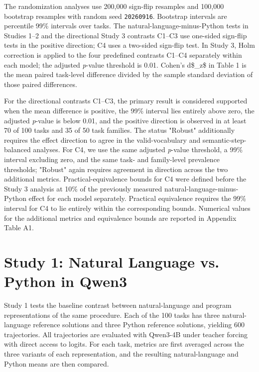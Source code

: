 \documentclass[sn-mathphys-num]{sn-jnl}
\begin{document}
The randomization analyses use 200,000 sign-flip resamples and 100,000 bootstrap resamples with random seed \texttt{20260916}. Bootstrap intervals are percentile 99\% intervals over tasks. The natural-language-minus-Python tests in Studies 1--2 and the directional Study 3 contrasts C1--C3 use one-sided sign-flip tests in the positive direction; C4 uses a two-sided sign-flip test. In Study 3, Holm correction is applied to the four predefined contrasts C1--C4 separately within each model; the adjusted \emph{p}-value threshold is 0.01. Cohen's d\$\_{z}\$ in Table 1 is the mean paired task-level difference divided by the sample standard deviation of those paired differences.

For the directional contrasts C1--C3, the primary result is considered supported when the mean difference is positive, the 99\% interval lies entirely above zero, the adjusted \emph{p}-value is below 0.01, and the positive direction is observed in at least 70 of 100 tasks and 35 of 50 task families. The status "Robust" additionally requires the effect direction to agree in the valid-vocabulary and semantic-step-balanced analyses. For C4, we use the same adjusted \emph{p}-value threshold, a 99\% interval excluding zero, and the same task- and family-level prevalence thresholds; "Robust" again requires agreement in direction across the two additional metrics. Practical-equivalence bounds for C4 were defined before the Study 3 analysis at 10\% of the previously measured natural-language-minus-Python effect for each model separately. Practical equivalence requires the 99\% interval for C4 to lie entirely within the corresponding bounds. Numerical values for the additional metrics and equivalence bounds are reported in Appendix Table A1.

\section{Study 1: Natural Language vs. Python in Qwen3}

Study 1 tests the baseline contrast between natural-language and program representations of the same procedure. Each of the 100 tasks has three natural-language reference solutions and three Python reference solutions, yielding 600 trajectories. All trajectories are evaluated with Qwen3-4B under teacher forcing with direct access to logits. For each task, metrics are first averaged across the three variants of each representation, and the resulting natural-language and Python means are then compared.
\end{document}
